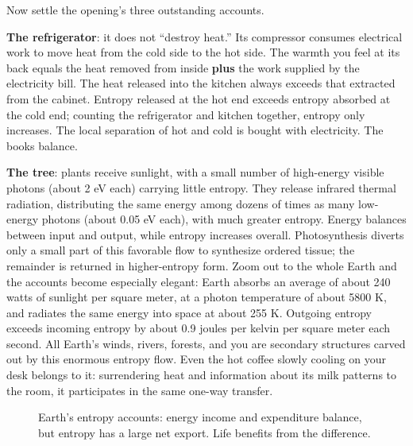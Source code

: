 
Now settle the opening's three outstanding accounts.

\textbf{The refrigerator}: it does not ``destroy heat.'' Its compressor consumes electrical work to move heat from the cold side to the hot side. The warmth you feel at its back equals the heat removed from inside \textbf{plus} the work supplied by the electricity bill. The heat released into the kitchen always exceeds that extracted from the cabinet. Entropy released at the hot end exceeds entropy absorbed at the cold end; counting the refrigerator and kitchen together, entropy only increases. The local separation of hot and cold is bought with electricity. The books balance.

\textbf{The tree}: plants receive sunlight, with a small number of high-energy visible photons (about 2 eV each) carrying little entropy. They release infrared thermal radiation, distributing the same energy among dozens of times as many low-energy photons (about 0.05 eV each), with much greater entropy. Energy balances between input and output, while entropy increases overall. Photosynthesis diverts only a small part of this favorable flow to synthesize ordered tissue; the remainder is returned in higher-entropy form. Zoom out to the whole Earth and the accounts become especially elegant: Earth absorbs an average of about 240 watts of sunlight per square meter, at a photon temperature of about 5800 K, and radiates the same energy into space at about 255 K. Outgoing entropy exceeds incoming entropy by about 0.9 joules per kelvin per square meter each second. All Earth's winds, rivers, forests, and you are secondary structures carved out by this enormous entropy flow. Even the hot coffee slowly cooling on your desk belongs to it: surrendering heat and information about its milk patterns to the room, it participates in the same one-way transfer.

\begin{figure}[htbp]
\centering
{}
\caption{Earth's entropy accounts: energy income and expenditure balance, but entropy has a large net export. Life benefits from the difference.}
\end{figure}

